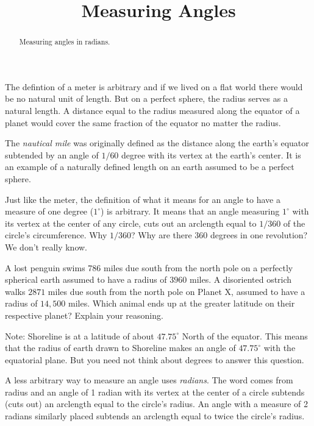 \documentclass{ximera}
\title{Measuring Angles}
\begin{document}
\begin{abstract}
Measuring angles in radians.
\end{abstract}
\maketitle

The defintion of a meter is arbitrary and if we lived on a flat world there would be no natural unit of length. But on a perfect sphere, the radius serves as a natural length. A distance equal to the radius measured along the equator of a planet would cover the same fraction of the equator no matter the radius.

The \emph{nautical mile} was originally defined as the distance along the earth's equator subtended by an angle of $1/60$ degree with its vertex at the earth's center. It is an example of a naturally defined length on an earth assumed to be a perfect sphere.

Just like the meter, the definition of what it means for an angle to have a measure of one degree ($1^\circ$) is arbitrary. It means that an angle measuring $1^\circ$ with its vertex at the center of any circle, cuts out an arclength equal to $1/360$ of the circle's circumference. Why $1/360$? Why are there 360 degrees in one revolution? We don't really know.

\begin{question}  \label{Q0:Radians}
A lost penguin swims 786 miles due south from the north pole on a perfectly spherical earth assumed to have a radius of $3960$ miles. A disoriented ostrich walks $2871$ miles due south from the north pole on Planet X, assumed to have a radius of $14,500$ miles. Which animal ends up at the greater latitude on their respective planet? Explain your reasoning.

Note: Shoreline is at a latitude of about $47.75^\circ$ North of the equator. This means that the radius of earth drawn to Shoreline makes an angle of  $47.75^\circ$ with the equatorial plane. But you need not think about degrees to answer this question.
\end{question}

A less arbitrary way to measure an angle uses \emph{radians}. The word comes from radius and an angle of 1 radian with its vertex at the center of a circle subtends (cuts out) an arclength equal to the circle's radius. An angle with a measure of 2 radians similarly placed subtends an arclength equal to twice the circle's radius. 
\end{document}
